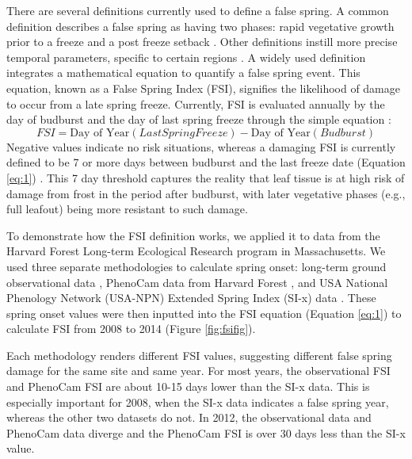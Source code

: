 \documentclass{article}\usepackage[]{graphicx}\usepackage[]{color}
\begin{document}
There are several definitions currently used to define a false spring. A common definition describes a false spring as having two phases: rapid vegetative growth prior to a freeze and a post freeze setback \citep{Gu2008}. Other definitions instill more precise temporal parameters, specific to certain regions \citep[e.g., in][false spring for the Midwestern United States is defined as a warmer than average March, a freezing April, and enough growing degree days between budburst and the last freeze date]{Augspurger2013}. A widely used definition integrates a mathematical equation to quantify a false spring event. This equation, known as a False Spring Index (FSI), signifies the likelihood of damage to occur from a late spring freeze. Currently, FSI is evaluated annually by the day of budburst and the day of last spring freeze through the simple equation \citep{Marino2011}:
\begin{equation} \label{eq:1}
FSI = \text{Day of Year} (Last Spring Freeze) - \text{Day of Year} (Budburst)
\end{equation}
Negative values indicate no risk situations, whereas a damaging FSI is currently defined to be 7 or more days between budburst and the last freeze date (Equation \ref{eq:1}) \citep{Peterson2014}. This 7 day threshold captures the reality that leaf tissue is at high risk of damage from frost in the period after budburst, with later vegetative phases (e.g., full leafout) being more resistant to such damage.%

To demonstrate how the FSI definition works, we applied it to data from the Harvard Forest Long-term Ecological Research program in Massachusetts. We used three separate methodologies to calculate spring onset: long-term ground observational data \citep{Okeefe2014}, PhenoCam data from Harvard Forest \citep{Richardson2015}, and USA National Phenology Network (USA-NPN) Extended Spring Index (SI-x) data \citep{USA-NPN2016}. These spring onset values were then inputted into the FSI equation (Equation \ref{eq:1}) to calculate FSI from 2008 to 2014 (Figure \ref{fig:fsifig}). 

Each methodology renders different FSI values, suggesting different false spring damage for the same site and same year. For most years, the observational FSI and PhenoCam FSI are about 10-15 days lower than the SI-x data. This is especially important for 2008, when the SI-x data indicates a false spring year, whereas the other two datasets do not. In 2012, the observational data and PhenoCam data diverge and the PhenoCam FSI is over 30 days less than the SI-x value.
\end{document}
